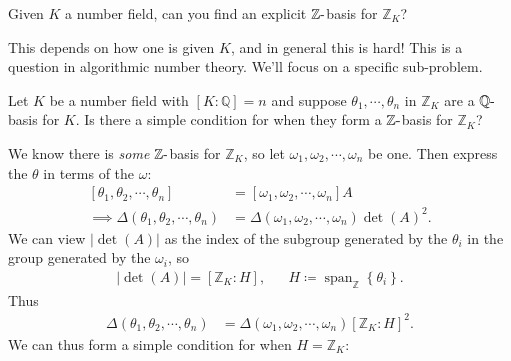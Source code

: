 \begin{question}

Given \(K\) a number field, can you find an explicit
\({\mathbb{Z}}{\hbox{-}}\)basis for \({\mathbb{Z}}_K\)?

\end{question}

\begin{remark}

This depends on how one is given \(K\), and in general this is hard!
This is a question in algorithmic number theory. We'll focus on a
specific sub-problem.

\end{remark}

\begin{question}

Let \(K\) be a number field with \([K : {\mathbb{Q}}] = n\) and suppose
\(\theta_1, \cdots, \theta_n\) in \({\mathbb{Z}}_K\) are a
\({\mathbb{Q}}{\hbox{-}}\)basis for \(K\). Is there a simple condition
for when they form a \({\mathbb{Z}}{\hbox{-}}\)basis for
\({\mathbb{Z}}_K\)?

\end{question}

\begin{remark}

We know there is \emph{some} \({\mathbb{Z}}{\hbox{-}}\)basis for
\({\mathbb{Z}}_K\), so let
\({ { \omega}_1, { \omega}_2, \cdots, { \omega}_{n}}\) be one. Then
express the \(\theta\) in terms of the \(\omega\):
\begin{align*}
{\left[ { { { \theta}_1, { \theta}_2, \cdots, { \theta}_{n}} } \right]} &= {\left[ { { { \omega}_1, { \omega}_2, \cdots, { \omega}_{n}} } \right]} A
\\
\implies 
{\Delta}({ { \theta}_1, { \theta}_2, \cdots, { \theta}_{n}} ) 
&= 
{\Delta}({ { \omega}_1, { \omega}_2, \cdots, { \omega}_{n}} ) \det(A)^2
.\end{align*}
We can view \({\left\lvert { \det(A) } \right\rvert}\) as the index of
the subgroup generated by the \(\theta_i\) in the group generated by the
\(\omega_i\), so
\begin{align*}
{\left\lvert { \det(A) } \right\rvert} = [ {\mathbb{Z}}_K : H], && H\coloneqq{\operatorname{span}}_{\mathbb{Z}}\left\{{ \theta_i }\right\}
.\end{align*}
Thus
\begin{align*}
{\Delta}({ { \theta}_1, { \theta}_2, \cdots, { \theta}_{n}} ) 
&= 
{\Delta}({ { \omega}_1, { \omega}_2, \cdots, { \omega}_{n}} )
[ {\mathbb{Z}}_K: H]^2
.\end{align*}
We can thus form a simple condition for when \(H = {\mathbb{Z}}_K\):

\end{remark}

